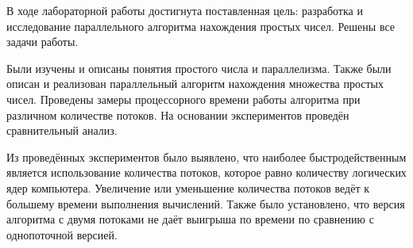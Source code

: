 В ходе лабораторной работы достигнута поставленная цель: разработка и исследование параллельного алгоритма нахождения простых чисел. Решены все задачи работы.

Были изучены и описаны понятия простого числа и параллелизма. Также были описан и реализован параллельный алгоритм нахождения множества простых чисел. Проведены замеры процессорного времени работы алгоритма при различном количестве потоков. На основании экспериментов проведён сравнительный анализ.

Из проведённых экспериментов было выявлено, что наиболее быстродейственным является использование количества потоков, которое равно количеству логических ядер компьютера. Увеличение или уменьшение количества потоков ведёт к большему времени выполнения вычислений. Также было установлено, что версия алгоритма с двумя потоками не даёт выигрыша по времени по сравнению с однопоточной версией.
